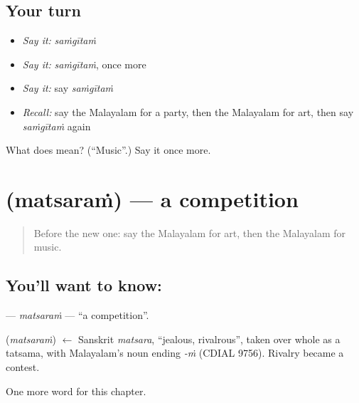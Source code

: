 \subsection*{Your turn}
\begin{itemize}
\raggedright
  \item \emph{Say it:} \emph{saṁgītaṁ}
  \item \emph{Say it:} \emph{saṁgītaṁ}, once more
  \item \emph{Say it:} say \emph{saṁgītaṁ}
  \item \emph{Recall:} say the Malayalam for a party, then the Malayalam for art, then say \emph{saṁgītaṁ} again
\end{itemize}

\begin{tcolorbox}[breakable,colback=teal!4,colframe=teal!35!black,title={Before you move on}]
What does  mean? (\textquotedblleft{}Music\textquotedblright{}.) Say it once more.
\end{tcolorbox}
\section[\texorpdfstring{\ml{മത്സരം} (matsaraṁ)}{മത്സരം (matsaraṁ)}]{ (matsaraṁ) — a competition}

\label{lesson:ML-C212-matsaram}



\begin{quote}
Before the new one: say the Malayalam for art, then the Malayalam for music.
\end{quote}

\subsection*{You'll want to know: }
\textbf{} — \emph{matsaraṁ} — \textquotedblleft{}a competition\textquotedblright{}.

\begin{cousinweb}
\textbf{} (\emph{matsaraṁ}) $\leftarrow$ Sanskrit \emph{matsara}, \textquotedblleft{}jealous, rivalrous\textquotedblright{}, taken over whole as a tatsama, with Malayalam's noun ending \emph{-ṁ} (CDIAL 9756). Rivalry became a contest.
\end{cousinweb}

\begin{grammarlens}[title={What you've built}]
One more word for this chapter.
\end{grammarlens}

